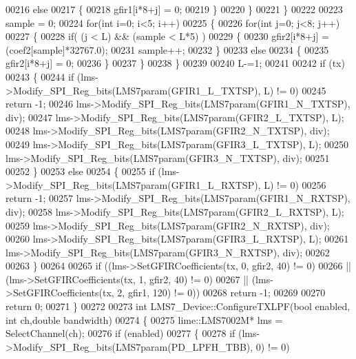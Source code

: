 \begin{DoxyCode}
00216             \textcolor{keywordflow}{else}
00217             \{
00218         gfir1[i*8+j] = 0;
00219             \}
00220     \}
00221     \}
00222 
00223     sample = 0;
00224     \textcolor{keywordflow}{for}(\textcolor{keywordtype}{int} i=0; i<5; i++)
00225     \{
00226     \textcolor{keywordflow}{for}(\textcolor{keywordtype}{int} j=0; j<8; j++)
00227         \{
00228             \textcolor{keywordflow}{if}( (j < L) && (sample < L*5) )
00229             \{
00230                 gfir2[i*8+j] = (coef2[sample]*32767.0);
00231         sample++;
00232             \}
00233             \textcolor{keywordflow}{else}
00234             \{
00235         gfir2[i*8+j] = 0;
00236             \}
00237     \}
00238     \}
00239 
00240     L-=1;
00241 
00242     \textcolor{keywordflow}{if} (tx)
00243     \{
00244         \textcolor{keywordflow}{if} (lms->Modify_SPI_Reg_bits(LMS7param(GFIR1_L_TXTSP), L) != 0)
00245            \textcolor{keywordflow}{return} -1;
00246         lms->Modify_SPI_Reg_bits(LMS7param(GFIR1_N_TXTSP), div);
00247         lms->Modify_SPI_Reg_bits(LMS7param(GFIR2_L_TXTSP), L);
00248         lms->Modify_SPI_Reg_bits(LMS7param(GFIR2_N_TXTSP), div);
00249         lms->Modify_SPI_Reg_bits(LMS7param(GFIR3_L_TXTSP), L);
00250         lms->Modify_SPI_Reg_bits(LMS7param(GFIR3_N_TXTSP), div);
00251 
00252     \}
00253     \textcolor{keywordflow}{else}
00254     \{
00255         \textcolor{keywordflow}{if} (lms->Modify_SPI_Reg_bits(LMS7param(GFIR1_L_RXTSP), L) != 0)
00256           \textcolor{keywordflow}{return} -1;
00257         lms->Modify_SPI_Reg_bits(LMS7param(GFIR1_N_RXTSP), div);
00258         lms->Modify_SPI_Reg_bits(LMS7param(GFIR2_L_RXTSP), L);
00259         lms->Modify_SPI_Reg_bits(LMS7param(GFIR2_N_RXTSP), div);
00260         lms->Modify_SPI_Reg_bits(LMS7param(GFIR3_L_RXTSP), L);
00261         lms->Modify_SPI_Reg_bits(LMS7param(GFIR3_N_RXTSP), div);
00262 
00263     \}
00264 
00265     \textcolor{keywordflow}{if} ((lms->SetGFIRCoefficients(tx, 0, gfir2, 40) != 0)
00266         || (lms->SetGFIRCoefficients(tx, 1, gfir2, 40) != 0)
00267         || (lms->SetGFIRCoefficients(tx, 2, gfir1, 120) != 0))
00268         \textcolor{keywordflow}{return} -1;
00269 
00270   \textcolor{keywordflow}{return} 0;
00271 \}
00272 
00273 \textcolor{keywordtype}{int} LMS7_Device::ConfigureTXLPF(\textcolor{keywordtype}{bool} enabled, \textcolor{keywordtype}{int} ch,\textcolor{keywordtype}{double} bandwidth)
00274 \{
00275     lime::LMS7002M* lms = SelectChannel(ch);
00276     \textcolor{keywordflow}{if} (enabled)
00277     \{
00278         \textcolor{keywordflow}{if} (lms->Modify_SPI_Reg_bits(LMS7param(PD_LPFH_TBB), 0) != 0)

\end{DoxyCode}
